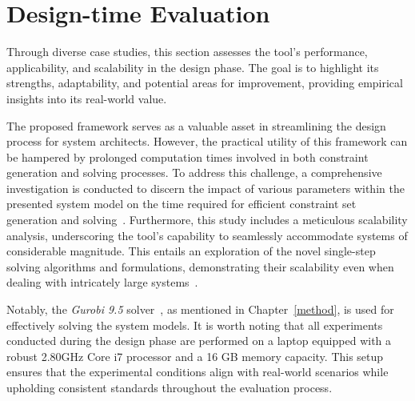    





   
    
    \section{Design-time Evaluation}\label{designTime}

    Through diverse case studies, this section assesses the tool's performance, applicability, and scalability in the design phase. The goal is to highlight its strengths, adaptability, and potential areas for improvement, providing empirical insights into its real-world value.

    The proposed framework serves as a valuable asset in streamlining the design process for system architects. However, the practical utility of this framework can be hampered by prolonged computation times involved in both constraint generation and solving processes. To address this challenge, a comprehensive investigation is conducted to discern the impact of various parameters within the presented system model on the time required for efficient constraint set generation and solving~\cite{9565115,askaripoor2023designer}.
    Furthermore, this study includes a meticulous scalability analysis, underscoring the tool's capability to seamlessly accommodate systems of considerable magnitude. This entails an exploration of the novel single-step solving algorithms and formulations, demonstrating their scalability even when dealing with intricately large systems~\cite{askaripoor2023designer}. 
    
    Notably, the \textit{Gurobi 9.5} solver~\cite{gurobi}, as mentioned in Chapter~\ref{method}, is used for effectively solving the system models. It is worth noting that all experiments conducted during the design phase are performed on a laptop equipped with a robust 2.80GHz Core i7 processor and a 16 GB memory capacity. This setup ensures that the experimental conditions align with real-world scenarios while upholding consistent standards throughout the evaluation process.
    
